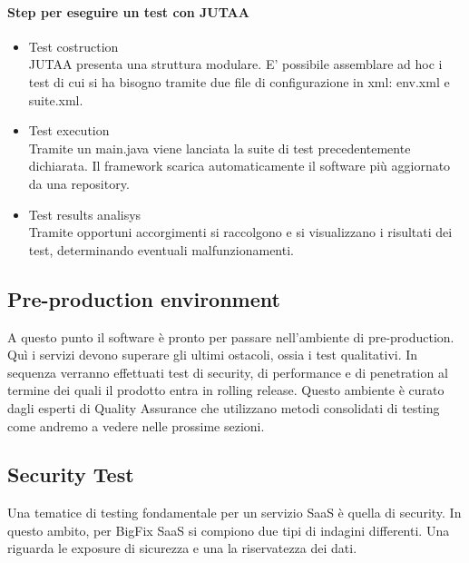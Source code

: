 \paragraph{Step per eseguire un test con JUTAA}
\begin{itemize}
	\item Test costruction \\
	JUTAA presenta una struttura modulare. E' possibile assemblare ad hoc i test di cui si ha bisogno tramite due file di configurazione in xml: env.xml e suite.xml. 
	\item Test execution\\
	Tramite un main.java viene lanciata la suite di test precedentemente dichiarata. Il framework scarica automaticamente il software più aggiornato da una repository.
	\item Test results analisys \\
	Tramite opportuni accorgimenti si raccolgono e si visualizzano i risultati dei test, determinando eventuali malfunzionamenti.
\end{itemize}
\subsection{Pre-production environment}
A questo punto il software è pronto per passare nell'ambiente di pre-production. Quì i servizi devono superare gli ultimi ostacoli, ossia i test qualitativi. In sequenza verranno effettuati test di security, di performance e di penetration al termine dei quali il prodotto entra in rolling release. Questo ambiente è curato dagli esperti di Quality Assurance che utilizzano metodi consolidati di testing come andremo a vedere nelle prossime sezioni.
\subsection{Security Test}
Una tematice di testing fondamentale per un servizio SaaS è quella di security. In questo ambito, per BigFix SaaS si compiono due tipi di indagini differenti. Una riguarda le exposure di sicurezza e una la riservatezza dei dati.
